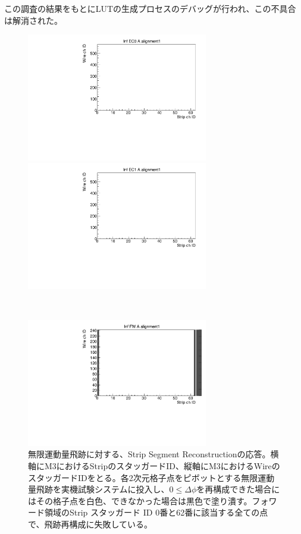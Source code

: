 この調査の結果をもとにLUTの生成プロセスのデバッグが行われ、この不具合は解消された。
\begin{figure}
    \begin{minipage}[b]{.5\linewidth}
        \centering
        \includegraphics[height=5.6cm]{fig/Test/B_InfEC0_strip.pdf}
    \end{minipage}
    \begin{minipage}[b]{.5\linewidth}
        \centering
        \includegraphics[height=5.6cm]{fig/Test/B_InfEC1_strip.pdf}
    \end{minipage}\\
    \begin{minipage}[b]{\linewidth}
        \centering
        \includegraphics[height=5.6cm]{fig/Test/B_InfFW_strip.pdf}
    \end{minipage}
    \caption[無限運動量飛跡に対する、Strip Segment Reconstructionの応答]{無限運動量飛跡に対する、Strip Segment Reconstructionの応答。横軸にM3におけるStripのスタッガードID、縦軸にM3におけるWireのスタッガードIDをとる。各2次元格子点をピボットとする無限運動量飛跡を実機試験システムに投入し、$0 \leq \Delta\phi$を再構成できた場合にはその格子点を白色、できなかった場合は黒色で塗り潰す。フォワード領域のStrip スタッガード ID 0番と62番に該当する全ての点で、飛跡再構成に失敗している。}
    \label{Inf_B_Strip}
\end{figure}

